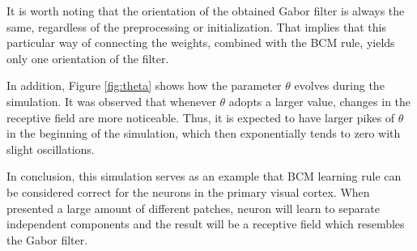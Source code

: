It is worth noting that the orientation of the obtained Gabor filter is always
the same, regardless of the preprocessing or initialization. That implies that
this particular way of connecting the weights, combined with the BCM rule,
yields only one orientation of the filter.

In addition, Figure \ref{fig:theta} shows how the parameter $\theta$ evolves
during the simulation. It was observed that whenever $\theta$ adopts a larger
value, changes in the receptive field are more noticeable. Thus, it is expected
to have larger pikes of $\theta$ in the beginning of the simulation, which then
exponentially tends to zero with slight oscillations.

In conclusion, this simulation serves as an example that BCM learning rule can
be considered correct for the neurons in the primary visual cortex. When
presented a large amount of different patches, neuron will learn to separate
independent components and the result will be a receptive field which resembles
the Gabor filter.
